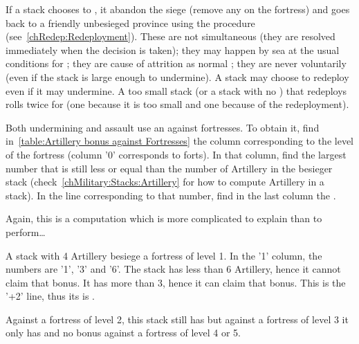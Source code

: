 If a stack chooses to , it abandon the siege (remove any
\USURE on the fortress) and goes back to a friendly unbesieged province using
the  procedure (see~\ref{chRedep:Redeployment}). These
 are not simultaneous (they are resolved immediately when
the decision is taken); they may happen by sea at the usual conditions for
; they are cause of attrition as normal
; they are never voluntarily (even if the stack is large
enough to undermine). A stack may choose to redeploy even if it may
undermine. A too small stack (or a stack with no \LoS) that redeploys rolls
twice for  (one  because it is too
small and one  because of the redeployment).



Both undermining and assault use an  against
fortresses. To obtain it, find in~\ref{table:Artillery bonus against
  Fortresses} the column corresponding to the level of the fortress (column
'0' corresponds to forts). In that column, find the largest number that is
still less or equal than the number of Artillery in the besieger stack
(check~\ref{chMilitary:Stacks:Artillery} for how to compute Artillery in a
stack). In the line corresponding to that number, find in the last column the
.

\begin{exemple}
  Again, this is a computation which is more complicated to explain than to
  perform\ldots

  A stack with 4 Artillery besiege a fortress of level 1. In the '1' column,
  the numbers are '1', '3' and '6'. The stack has less than 6 Artillery, hence
  it cannot claim that bonus. It has more than 3, hence it can claim that
  bonus. This is the '+2' line, thus its  is
  .

  Against a fortress of level 2, this stack still has  but against a
  fortress of level 3 it only has  and no bonus against a fortress
  of level 4 or 5.
\end{exemple}

